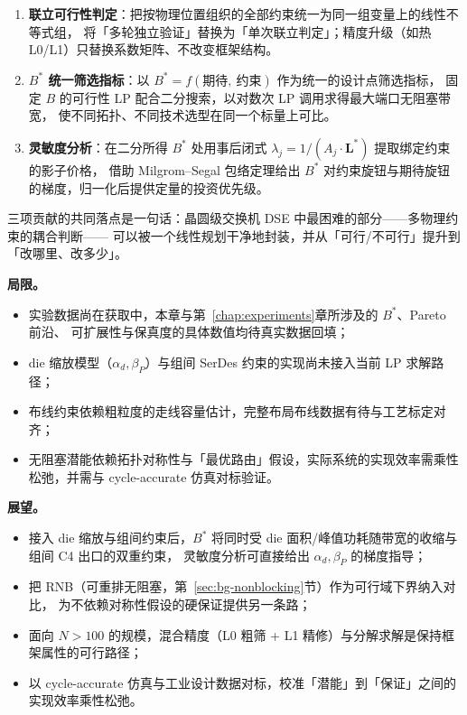 \begin{enumerate}
    \item \textbf{联立可行性判定}：把按物理位置组织的全部约束统一为同一组变量上的线性不等式组，
    将「多轮独立验证」替换为「单次联立判定」；精度升级（如热 L0/L1）只替换系数矩阵、不改变框架结构。
    \item \textbf{$B^*$ 统一筛选指标}：以 $B^* = f(\text{期待},\ \text{约束})$ 作为统一的设计点筛选指标，
    固定 $B$ 的可行性 LP 配合二分搜索，以对数次 LP 调用求得最大端口无阻塞带宽，
    使不同拓扑、不同技术选型在同一个标量上可比。
    \item \textbf{灵敏度分析}：在二分所得 $B^*$ 处用事后闭式 $\lambda_j = 1/(A_j\cdot\mathbf{L}^*)$ 提取绑定约束的影子价格，
    借助 Milgrom--Segal 包络定理给出 $B^*$ 对约束旋钮与期待旋钮的梯度，归一化后提供定量的投资优先级。
\end{enumerate}

三项贡献的共同落点是一句话：晶圆级交换机 DSE 中最困难的部分——多物理约束的耦合判断——
可以被一个线性规划干净地封装，并从「可行/不可行」提升到「改哪里、改多少」。

\textbf{局限。}
\begin{itemize}
    \item 实验数据尚在获取中，本章与第~\ref{chap:experiments}章所涉及的 $B^*$、Pareto 前沿、
    可扩展性与保真度的具体数值均待真实数据回填；
    \item die 缩放模型（$\alpha_d,\beta_P$）与组间 SerDes 约束的实现尚未接入当前 LP 求解路径；
    \item 布线约束依赖粗粒度的走线容量估计，完整布局布线数据有待与工艺标定对齐；
    \item 无阻塞潜能依赖拓扑对称性与「最优路由」假设，实际系统的实现效率需乘性松弛，并需与 cycle-accurate 仿真对标验证。
\end{itemize}

\textbf{展望。}
\begin{itemize}
    \item 接入 die 缩放与组间约束后，$B^*$ 将同时受 die 面积/峰值功耗随带宽的收缩与组间 C4 出口的双重约束，
    灵敏度分析可直接给出 $\alpha_d,\beta_P$ 的梯度指导；
    \item 把 RNB（可重排无阻塞，第~\ref{sec:bg-nonblocking}节）作为可行域下界纳入对比，
    为不依赖对称性假设的硬保证提供另一条路；
    \item 面向 $N>100$ 的规模，混合精度（L0 粗筛 + L1 精修）与分解求解是保持框架属性的可行路径；
    \item 以 cycle-accurate 仿真与工业设计数据对标，校准「潜能」到「保证」之间的实现效率乘性松弛。
\end{itemize}
